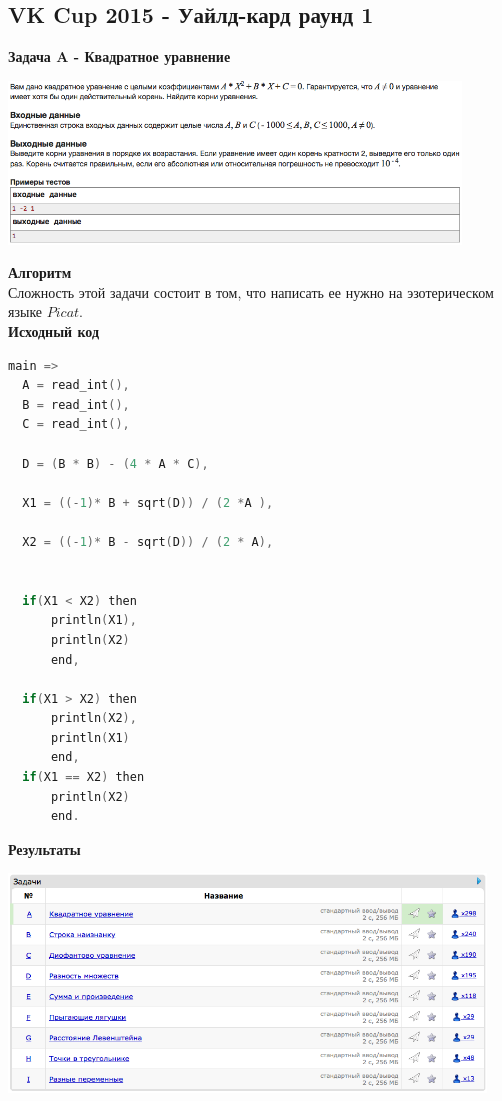 \documentclass[a4paper,12pt]{article}
\begin{document}
\newpage
\subsection{ VK Cup 2015 - Уайлд-кард раунд 1}

\textbf{{\large Задача A - Квадратное уравнение}} \\
\begin{center}
\includegraphics[width=0.9\textwidth]{VK_1/VK_1_A.png}\\ [1cm]
\end{center}
\textbf{{\large Алгоритм}} \\
Сложность этой задачи состоит в том, что написать ее нужно на эзотерическом языке $Picat$.\\

\textbf{{\large Исходный код}}
\begin{lstlisting}[language=C]
 main =>
  A = read_int(),
  B = read_int(),
  C = read_int(),
  
  D = (B * B) - (4 * A * C),
  
  X1 = ((-1)* B + sqrt(D)) / (2 *A ),
  
  X2 = ((-1)* B - sqrt(D)) / (2 * A),
  
  
  if(X1 < X2) then
      println(X1),
      println(X2)
      end,

  if(X1 > X2) then
      println(X2),
      println(X1)
      end,
  if(X1 == X2) then
      println(X2)
      end.
\end{lstlisting}

\textbf{{\large Результаты}} \\
\begin{center}
\includegraphics[width=0.95\textwidth]{VK_1/VK_1_result.png}\\ [1cm]
\end{center}
\end{document}
